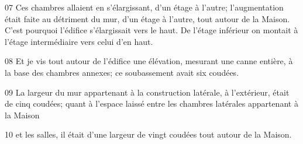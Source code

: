 
07 Ces chambres allaient en s’élargissant, d’un étage à l’autre; l’augmentation était faite au détriment du mur, d’un étage à l’autre, tout autour de la Maison. C’est pourquoi l’édifice s’élargissait vers le haut. De l’étage inférieur on montait à l’étage intermédiaire vers celui d’en haut.

08 Et je vis tout autour de l’édifice une élévation, mesurant une canne entière, à la base des chambres annexes; ce soubassement avait six coudées.

09 La largeur du mur appartenant à la construction latérale, à l’extérieur, était de cinq coudées; quant à l’espace laissé entre les chambres latérales appartenant à la Maison

10 et les salles, il était d’une largeur de vingt coudées tout autour de la Maison.

